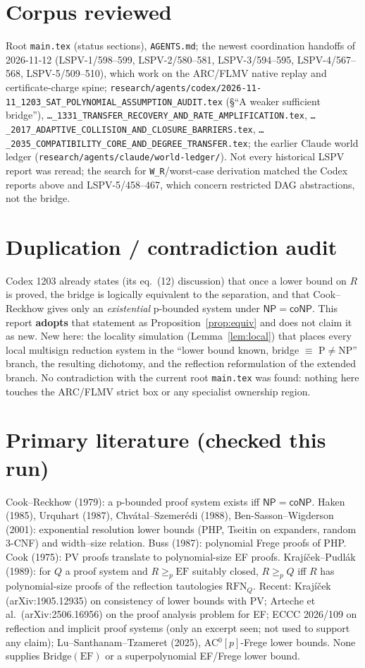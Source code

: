 \documentclass[11pt]{article}
\newcommand{\NP}{\mathsf{NP}}
\newcommand{\coNP}{\mathsf{coNP}}
\begin{document}
\section*{Corpus reviewed}
Root \texttt{main.tex} (status sections), \texttt{AGENTS.md}; the newest
coordination handoffs of 2026-11-12 (LSPV-1/598--599, LSPV-2/580--581,
LSPV-3/594--595, LSPV-4/567--568, LSPV-5/509--510), which work on the
ARC/FLMV native replay and certificate-charge spine;
\texttt{research/agents/codex/2026-11-11\_1203\_SAT\_POLYNOMIAL\_ASSUMPTION\_AUDIT.tex}
(\S``A weaker sufficient bridge''), \texttt{\ldots\_1331\_TRANSFER\_RECOVERY\_AND\_RATE\_AMPLIFICATION.tex},
\texttt{\ldots\_2017\_ADAPTIVE\_COLLISION\_AND\_CLOSURE\_BARRIERS.tex},
\texttt{\ldots\_2035\_COMPATIBILITY\_CORE\_AND\_DEGREE\_TRANSFER.tex};
the earlier Claude world ledger (\texttt{research/agents/claude/world-ledger/}).
Not every historical LSPV report was reread; the search for
\texttt{W\_R}/worst-case derivation matched the Codex reports above and LSPV-5/458--467,
which concern restricted DAG abstractions, not the bridge.

\section*{Duplication / contradiction audit}
Codex 1203 already states (its eq.~(12) discussion) that once a lower bound on
$R$ is proved, the bridge is logically equivalent to the separation, and that
Cook--Reckhow gives only an \emph{existential} p-bounded system under
$\NP=\coNP$. This report \textbf{adopts} that statement as Proposition~\ref{prop:equiv}
and does not claim it as new. New here: the locality simulation
(Lemma~\ref{lem:local}) that places every local multisign reduction system in
the ``lower bound known, bridge $\equiv$ P$\ne$NP'' branch, the resulting
dichotomy, and the reflection reformulation of the extended branch. No
contradiction with the current root \texttt{main.tex} was found: nothing here
touches the ARC/FLMV strict box or any specialist ownership region.

\section*{Primary literature (checked this run)}
Cook--Reckhow (1979): a p-bounded proof system exists iff $\NP=\coNP$.
Haken (1985), Urquhart (1987), Chv\'atal--Szemer\'edi (1988), Ben-Sasson--Wigderson
(2001): exponential resolution lower bounds (PHP, Tseitin on expanders,
random 3-CNF) and width--size relation. Buss (1987): polynomial Frege proofs of
PHP. Cook (1975): PV proofs translate to polynomial-size EF proofs.
Krajíček--Pudlák (1989): for $Q$ a proof system and $R\ge_p\mathrm{EF}$ suitably
closed, $R\ge_p Q$ iff $R$ has polynomial-size proofs of the reflection
tautologies $\mathrm{RFN}_Q$. Recent: Krajíček (arXiv:1905.12935) on consistency
of lower bounds with PV; Arteche et al.\ (arXiv:2506.16956) on the proof analysis
problem for EF; ECCC 2026/109 on reflection and implicit proof systems (only an
excerpt seen; not used to support any claim); Lu--Santhanam--Tzameret (2025),
AC$^0[p]$-Frege lower bounds. None supplies $\mathrm{Bridge}(\mathrm{EF})$
or a superpolynomial EF/Frege lower bound.
\end{document}
